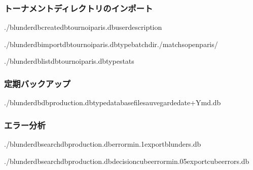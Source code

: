 \documentclass[letterpaper,10pt,dvipdfmx]{sphinxmanual}
\begin{document}
\subsubsection{トーナメントディレクトリのインポート}
\label{\detokenize{cli:import-d-un-repertoire-de-tournoi}}
\begin{sphinxVerbatim}[commandchars=\\\{\}]
./blunderdbcreate\PYGZhy{}\PYGZhy{}dbtournoi\PYGZus{}paris.db\PYGZhy{}\PYGZhy{}user\PYGZhy{}\PYGZhy{}description

./blunderdbimport\PYGZhy{}\PYGZhy{}dbtournoi\PYGZus{}paris.db\PYGZhy{}\PYGZhy{}typebatch\PYGZhy{}\PYGZhy{}dir./matchs\PYGZus{}open\PYGZus{}paris/

./blunderdblist\PYGZhy{}\PYGZhy{}dbtournoi\PYGZus{}paris.db\PYGZhy{}\PYGZhy{}typestats
\end{sphinxVerbatim}


\subsubsection{定期バックアップ}
\label{\detokenize{cli:sauvegarde-reguliere}}
\begin{sphinxVerbatim}[commandchars=\\\{\}]
./blunderdb\PYGZhy{}\PYGZhy{}dbproduction.db\PYGZhy{}\PYGZhy{}typedatabase\PYGZhy{}\PYGZhy{}filesauvegarde\PYGZhy{}date+\PYGZpc{}Y\PYGZpc{}m\PYGZpc{}d.db
\end{sphinxVerbatim}


\subsubsection{エラー分析}
\label{\detokenize{cli:analyse-des-erreurs}}
\begin{sphinxVerbatim}[commandchars=\\\{\}]
./blunderdbsearch\PYGZhy{}\PYGZhy{}dbproduction.db\PYGZhy{}\PYGZhy{}error\PYGZhy{}min.1\PYGZhy{}\PYGZhy{}exportblunders.db

./blunderdbsearch\PYGZhy{}\PYGZhy{}dbproduction.db\PYGZhy{}\PYGZhy{}decisioncube\PYGZhy{}\PYGZhy{}error\PYGZhy{}min.05\PYGZhy{}\PYGZhy{}exportcube\PYGZus{}errors.db
\end{sphinxVerbatim}
\end{document}
